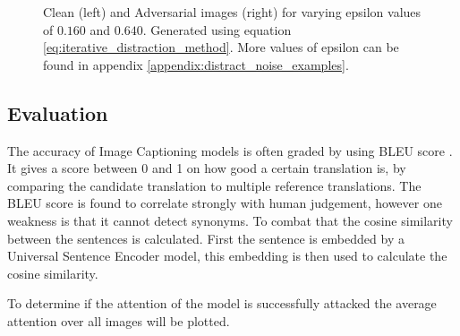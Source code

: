 \begin{figure}[h]
    \centering
    \vspace{\floatsep}
    \vspace{\floatsep}
    \vspace{\floatsep}
    \caption{Clean (left) and Adversarial images (right) for varying epsilon values of $0.160$ and $0.640$. Generated using equation \ref{eq:iterative_distraction_method}. More values of epsilon can be found in appendix \ref{appendix:distract_noise_examples}.}
    \label{fig:distract_noise_examples}
\end{figure}

\subsection{Evaluation}
The accuracy of Image Captioning models is often graded by using BLEU score \cite{papineni_roukos_ward_zhu_2001}. It gives a score between 0 and 1 on how good a certain translation is, by comparing the candidate translation to multiple reference translations. The BLEU score is found to correlate strongly with human judgement, however one weakness is that it cannot detect synonyms. To combat that the cosine similarity between the sentences is calculated. First the sentence is embedded by a Universal Sentence Encoder\cite{DBLP:journals/corr/abs-1803-11175} model, this embedding is then used to calculate the cosine similarity.

To determine if the attention of the model is successfully attacked the average attention over all images will be plotted.